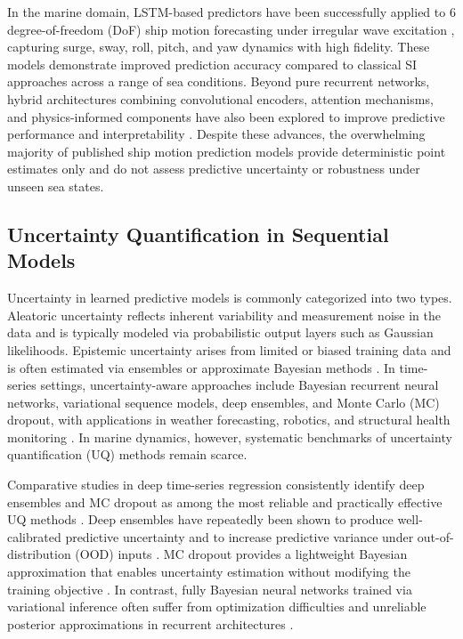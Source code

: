 \documentclass[a4paper,fleqn]{cas-sc}
\begin{document}
In the marine domain, LSTM-based predictors have been successfully applied to 6 degree-of-freedom (DoF) ship motion forecasting under irregular wave excitation \cite{silva2022ship, zhang2023deep, zhang2021multiscale, dagostino2022recurrent, ferrandis2021learning, skulstad2019dead, lee2025comparative}, capturing surge, sway, roll, pitch, and yaw dynamics with high fidelity. These models demonstrate improved prediction accuracy compared to classical SI approaches across a range of sea conditions. Beyond pure recurrent networks, hybrid architectures combining convolutional encoders, attention mechanisms, and physics-informed components have also been explored to improve predictive performance and interpretability \cite{gong2025wavelet, baier2021hybrid, sun2022shipmotion, zhang2023roll, schirmann2023comparison}. Despite these advances, the overwhelming majority of published ship motion prediction models provide deterministic point estimates only \cite{silva2022ship, zhang2023deep, gong2025wavelet, schirmann2022datadriven} and do not assess predictive uncertainty or robustness under unseen sea states.

\subsection{Uncertainty Quantification in Sequential Models}

Uncertainty in learned predictive models is commonly categorized into two types. Aleatoric uncertainty reflects inherent variability and measurement noise in the data and is typically modeled via probabilistic output layers such as Gaussian likelihoods. Epistemic uncertainty arises from limited or biased training data and is often estimated via ensembles or approximate Bayesian methods \cite{abdar2021review}. In time-series settings, uncertainty-aware approaches include Bayesian recurrent neural networks, variational sequence models, deep ensembles, and Monte Carlo (MC) dropout, with applications in weather forecasting, robotics, and structural health monitoring \cite{abdar2021review, foldesi2023comparison}. In marine dynamics, however, systematic benchmarks of uncertainty quantification (UQ) methods remain scarce.

Comparative studies in deep time-series regression consistently identify deep ensembles and MC dropout as among the most reliable and practically effective UQ methods \cite{foldesi2023comparison}. Deep ensembles \cite{lakshminarayanan2017} have repeatedly been shown to produce well-calibrated predictive uncertainty and to increase predictive variance under out-of-distribution (OOD) inputs \cite{ovadia2019can, foldesi2023comparison}. MC dropout provides a lightweight Bayesian approximation that enables uncertainty estimation without modifying the training objective \cite{gal2016dropout}. In contrast, fully Bayesian neural networks trained via variational inference often suffer from optimization difficulties and unreliable posterior approximations in recurrent architectures \cite{foldesi2023comparison}.
\end{document}

